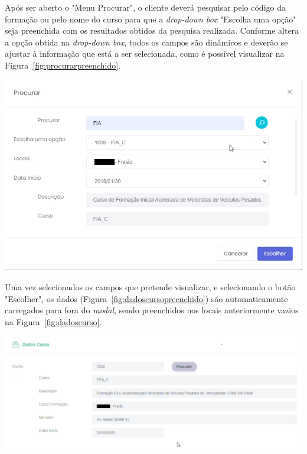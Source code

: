 Após ser aberto o "Menu Procurar", o cliente deverá pesquisar pelo código da formação ou pelo nome do curso para que a \textit{drop-down box} "Escolha uma opção" seja preenchida com os resultados obtidos da pesquisa realizada. Conforme altera a opção obtida na \textit{drop-down box}, todos os campos são dinâmicos e deverão se ajustar à informação que está a ser selecionada, como é possível visualizar na Figura~\ref{fig:procurarpreenchido}.

\begin{center}
        \includegraphics[width=\textwidth,height=\textheight,keepaspectratio]{images/procurardados.png}
        \label{fig:procurarpreenchido}
\end{center}

Uma vez selecionados os campos que pretende visualizar, e selecionando o botão "Escolher", os dados (Figura~\ref{fig:dadoscursopreenchido}) são automaticamente carregados para fora do \textit{modal}, sendo preenchidos nos locais anteriormente vazios na Figura~\ref{fig:dadoscurso}.

\begin{center}
        \includegraphics[width=\textwidth,height=\textheight,keepaspectratio]{images/dadoscursopreenchido.png}
        \label{fig:dadoscursopreenchido}
\end{center}

